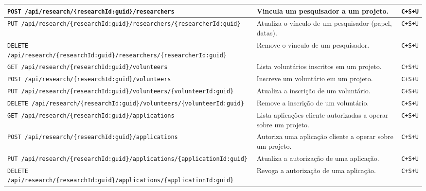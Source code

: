 \begin{longtable}{|p{}|p{}|p{}|}
\texttt{POST /api/research/\newline\{researchId:guid\}/researchers} & Vincula um pesquisador a um projeto. & \texttt{C+S+U} \\ \hline
\texttt{PUT /api/research/\newline\{researchId:guid\}/researchers/\newline\{researcherId:guid\}} & Atualiza o vínculo de um pesquisador (papel, datas). & \texttt{C+S+U} \\ \hline
\texttt{DELETE /api/research/\newline\{researchId:guid\}/researchers/\newline\{researcherId:guid\}} & Remove o vínculo de um pesquisador. & \texttt{C+S+U} \\ \hline
\texttt{GET /api/research/\newline\{researchId:guid\}/volunteers} & Lista voluntários inscritos em um projeto. & \texttt{C+S+U} \\ \hline
\texttt{POST /api/research/\newline\{researchId:guid\}/volunteers} & Inscreve um voluntário em um projeto. & \texttt{C+S+U} \\ \hline
\texttt{PUT /api/research/\newline\{researchId:guid\}/volunteers/\newline\{volunteerId:guid\}} & Atualiza a inscrição de um voluntário. & \texttt{C+S+U} \\ \hline
\texttt{DELETE /api/research/\newline\{researchId:guid\}/volunteers/\newline\{volunteerId:guid\}} & Remove a inscrição de um voluntário. & \texttt{C+S+U} \\ \hline
\texttt{GET /api/research/\newline\{researchId:guid\}/applications} & Lista aplicações cliente autorizadas a operar sobre um projeto. & \texttt{C+S+U} \\ \hline
\texttt{POST /api/research/\newline\{researchId:guid\}/applications} & Autoriza uma aplicação cliente a operar sobre um projeto. & \texttt{C+S+U} \\ \hline
\texttt{PUT /api/research/\newline\{researchId:guid\}/applications/\newline\{applicationId:guid\}} & Atualiza a autorização de uma aplicação. & \texttt{C+S+U} \\ \hline
\texttt{DELETE /api/research/\newline\{researchId:guid\}/applications/\newline\{applicationId:guid\}} & Revoga a autorização de uma aplicação. & \texttt{C+S+U} \\ \hline

\end{longtable}
